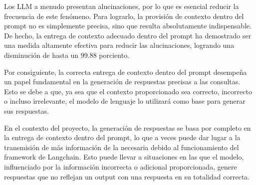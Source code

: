 Los LLM a menudo presentan alucinaciones, por lo que es esencial reducir la frecuencia de este fenómeno. Para lograrlo, la provisión de contexto dentro del prompt no es simplemente precisa, sino que resulta absolutamente indispensable. De hecho, la entrega de contexto adecuado dentro del prompt ha demostrado ser una medida altamente efectiva para reducir las alucinaciones, logrando una disminución de hasta un 99.88 porciento. \cite{riego1}

Por consiguiente, la correcta entrega de contexto dentro del prompt desempeña un papel fundamental en la generación de respuestas precisas a las consultas. Esto se debe a que, ya sea que el contexto proporcionado sea correcto, incorrecto o incluso irrelevante, el modelo de lenguaje lo utilizará como base para generar sus respuestas.

En el contexto del proyecto, la generación de respuestas se basa por completo en la entrega de contexto dentro del prompt, lo que a veces puede dar lugar a la transmisión de más información de la necesaria debido al funcionamiento del framework de Langchain. Esto puede llevar a situaciones en las que el modelo, influenciado por la información incorrecta o adicional proporcionada, genere respuestas que no reflejan un output con una respuesta en su totalidad correcta.












